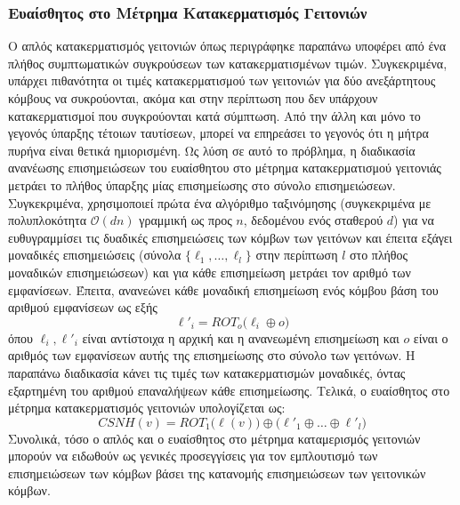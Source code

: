 \subsubsection{Ευαίσθητος στο Μέτρημα Κατακερματισμός Γειτονιών}
Ο απλός κατακερματισμός γειτονιών όπως περιγράφηκε παραπάνω υποφέρει από ένα πλήθος συμπτωματικών συγκρούσεων των κατακερματισμένων τιμών.
Συγκεκριμένα, υπάρχει πιθανότητα οι τιμές κατακερματισμού των γειτονιών για δύο ανεξάρτητους κόμβους να συκρούονται, ακόμα και στην περίπτωση που δεν υπάρχουν κατακερματισμοί που συγκρούονται κατά σύμπτωση. Από την άλλη και μόνο το γεγονός ύπαρξης τέτοιων ταυτίσεων, μπορεί να επηρεάσει το γεγονός ότι η μήτρα πυρήνα είναι θετικά ημιορισμένη.
Ως λύση σε αυτό το πρόβλημα, η διαδικασία ανανέωσης επισημειώσεων του ευαίσθητου στο μέτρημα κατακερματισμού γειτονιάς μετράει το πλήθος ύπαρξης μίας επισημείωσης στο σύνολο επισημειώσεων.
Συγκεκριμένα, χρησιμοποιεί πρώτα ένα αλγόριθμο ταξινόμησης (συγκεκριμένα  με πολυπλοκότητα $\mathcal{O}(d n)$ γραμμική ως προς $n$, δεδομένου ενός σταθερού $d$) για να ευθυγραμμίσει τις δυαδικές επισημειώσεις των κόμβων των γειτόνων και έπειτα εξάγει μοναδικές επισημειώσεις (σύνολα $\{ \ell_1, \ldots, \ell_l \}$ στην περίπτωση $l$ στο πλήθος μοναδικών επισημειώσεων) και για κάθε επισημείωση μετράει τον αριθμό των εμφανίσεων.
Έπειτα, ανανεώνει κάθε μοναδική επισημείωση ενός κόμβου βάση του αριθμού εμφανίσεων ως εξής
\begin{equation}
    \ell'_i = ROT_o \big( \ell_i \oplus o \big)
\end{equation}
όπου $\ell_i, \ell'_i$ είναι αντίστοιχα η αρχική και η ανανεωμένη επισημείωση και $o$ είναι ο αριθμός των εμφανίσεων αυτής της επισημείωσης στο σύνολο των γειτόνων.
Η παραπάνω διαδικασία κάνει τις τιμές των κατακερματισμών μοναδικές, όντας εξαρτημένη του αριθμού επαναλήψεων κάθε επισημείωσης.
Τελικά, ο ευαίσθητος στο μέτρημα κατακερματισμός γειτονιών υπολογίζεται ως:
\begin{equation}
    CSNH(v) = ROT_1 \big( \ell(v) \big) \oplus \big( \ell'_1 \oplus \ldots \oplus \ell'_l \big)
\end{equation}
Συνολικά, τόσο ο απλός και ο ευαίσθητος στο μέτρημα καταμερισμός γειτονιών μπορούν να ειδωθούν ως γενικές προσεγγίσεις για τον εμπλουτισμό των επισημειώσεων των κόμβων βάσει της κατανομής επισημειώσεων των γειτονικών κόμβων.

